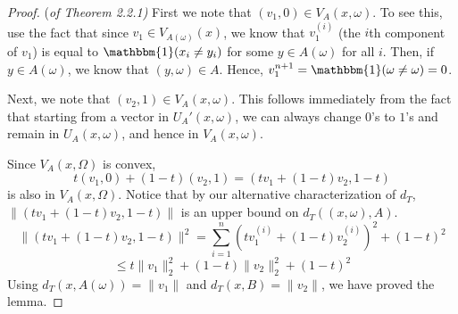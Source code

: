 \documentclass[12pt]{report}
\theoremstyle{definition}
\begin{document}
\begin{proof}{(\em of Theorem 2.2.1)}
First we note that $(v_1,0)\in V_A(x,\omega)$.  To see this, use the fact that since $v_1\in V_{A(\omega)}(x)$, we know that $v_1^{(i)}$ (the $i$th component of $v_1$) is equal to $\mathbbm{1}(x_i\not = y_i)$ for some $y\in A(\omega)$ for all $i$.  Then, if $y\in A(\omega)$, we know that $(y,\omega)\in A$.  Hence, $v_1^{n+1}=\mathbbm{1}(\omega\not =\omega)=0$.  

Next, we note that $(v_2,1)\in V_A(x,\omega)$. This follows immediately from the fact that starting from a vector in $U_A'(x,\omega)$, we can always change $0$'s to $1$'s and remain in $U_A(x,\omega)$, and hence in $V_A(x,\omega)$.

Since $V_A(x,\Omega)$ is convex, 
$$
t(v_1,0)+(1-t)(v_2,1)=(tv_1+(1-t)v_2,1-t)
$$
is also in $V_A(x,\Omega)$.  Notice that by our alternative characterization of $d_T$, $\|(tv_1+(1-t)v_2,1-t)\|$ is an upper bound on $d_T((x,\omega),A)$.  
$$
\|(tv_1+(1-t)v_2,1-t)\|^2=\sum_{i=1}^n(tv_1^{(i)}+(1-t)v_2^{(i)})^2+(1-t)^2
$$
$$
\leq t\|v_1\|_2^2+(1-t)\|v_2\|_2^2+(1-t)^2
$$
Using $d_T(x,A(\omega))=\|v_1\|$ and $d_T(x,B)=\|v_2\|$, we have proved the lemma.  


\end{proof}
\end{document}
